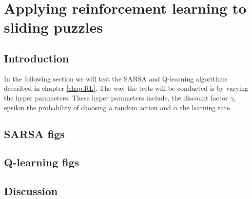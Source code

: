 \graphicspath{{Experiments\_and\_Results/fig}}

\chapter{Applying reinforcement learning to sliding puzzles}
\label{chap:Experiments_and_Results}
\section{Introduction}
In the following section we will test the SARSA and Q-learning algorithms described in chapter \ref{chap:RL}. The way the tests will be conducted is by varying the hyper parameters. These hyper parameters include, the discount factor $\gamma$, epsilon the probability of choosing a random action and $\alpha$ the learning rate.
\section{SARSA figs}

\section{Q-learning figs}

\section{Discussion}

